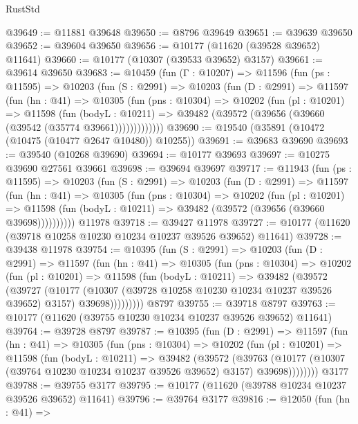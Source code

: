 \begin{lexlean}{RustStd}
\begin{coremodule}
@39649 := @11881 @39648
@39650 := @8796 @39649
@39651 := @39639 @39650
@39652 := @39604 @39650
@39656 := @10177 (@11620 (@39528 @39652) @11641)
@39660 := @10177 (@10307 (@39533 @39652) @3157)
@39661 := @39614 @39650
@39683 := @10459
    (fun (Γ : @10207) =>
    @11596
      (fun (ps : @11595) =>
      @10203
        (fun (S : @2991) =>
        @10203
          (fun (D : @2991) =>
          @11597
            (fun (hn : @41) =>
            @10305
              (fun (pns : @10304) =>
              @10202
                (fun (pl : @10201) =>
                @11598
                  (fun (bodyL : @10211) =>
                  @39482 (@39572 (@39656 (@39660 (@39542 (@35774 @39661)))))))))))))
@39690 := @19540 (@35891 (@10472 (@10475 (@10477 @2647 @10480)) @10255))
@39691 := @39683 @39690
@39693 := @39540 (@10268 @39690)
@39694 := @10177 @39693
@39697 := @10275 @39690 @27561 @39661
@39698 := @39694 @39697
@39717 := @11943
    (fun (ps : @11595) =>
    @10203
      (fun (S : @2991) =>
      @10203
        (fun (D : @2991) =>
        @11597
          (fun (hn : @41) =>
          @10305
            (fun (pns : @10304) =>
            @10202
              (fun (pl : @10201) =>
              @11598 (fun (bodyL : @10211) => @39482 (@39572 (@39656 (@39660 @39698))))))))))
    @11978
@39718 := @39427 @11978
@39727 := @10177 (@11620 (@39718 @10258 @10230 @10234 @10237 @39526 @39652) @11641)
@39728 := @39438 @11978
@39754 := @10395
    (fun (S : @2991) =>
    @10203
      (fun (D : @2991) =>
      @11597
        (fun (hn : @41) =>
        @10305
          (fun (pns : @10304) =>
          @10202
            (fun (pl : @10201) =>
            @11598
              (fun (bodyL : @10211) =>
              @39482
                (@39572
                  (@39727
                    (@10177
                      (@10307 (@39728 @10258 @10230 @10234 @10237 @39526 @39652) @3157)
                      @39698)))))))))
    @8797
@39755 := @39718 @8797
@39763 := @10177 (@11620 (@39755 @10230 @10234 @10237 @39526 @39652) @11641)
@39764 := @39728 @8797
@39787 := @10395
    (fun (D : @2991) =>
    @11597
      (fun (hn : @41) =>
      @10305
        (fun (pns : @10304) =>
        @10202
          (fun (pl : @10201) =>
          @11598
            (fun (bodyL : @10211) =>
            @39482
              (@39572
                (@39763
                  (@10177 (@10307 (@39764 @10230 @10234 @10237 @39526 @39652) @3157) @39698))))))))
    @3177
@39788 := @39755 @3177
@39795 := @10177 (@11620 (@39788 @10234 @10237 @39526 @39652) @11641)
@39796 := @39764 @3177
@39816 := @12050
    (fun (hn : @41) =>

\end{coremodule}
\end{lexlean}
